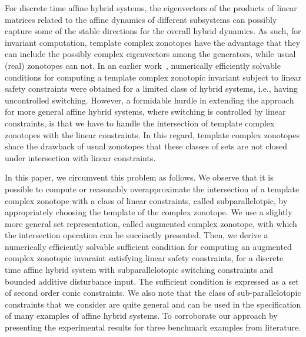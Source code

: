 

For discrete time affine hybrid systems, the eigenvectors of the
products of linear matrices related to the affine dynamics of
different subsystems can possibly capture some of the stable
directions for the overall hybrid dynamics.  As such, for invariant
computation, template complex zonotopes have the advantage that they
can include the possibly complex eigenvectors among the generators,
while usual (real) zonotopes can not.  In an earlier
work~\cite{tcz2017}, numerically efficiently solvable conditions for
computing a template complex zonotopic invariant subject to linear
safety constraints were obtained for a limited class of hybrid
systems, i.e., having uncontrolled switching.  However, a formidable
hurdle in extending the approach for more general affine hybrid
systems, where switching is controlled by linear constraints, is that
we have to handle the intersection of template complex zonotopes with
the linear constraints.  In this regard, template complex zonotopes
share the drawback of usual zonotopes that these classes of sets are
not closed under intersection with linear constraints.

In this paper, we circumvent this problem as follows.  We observe that
it is possible to compute or reasonably overapproximate the
intersection of a template complex zonotope with a class of linear
constraints, called subparallelotpic, by appropriately choosing the
template of the complex zonotope.  We use a slightly more general set
representation, called augmented complex zonotope, with which the
intersection operation can be succinctly presented.  %
Then, we derive a numerically efficiently solvable
sufficient condition for computing an augmented complex zonotopic
invaraint satisfying linear safety constraints, for a discrete time
affine hybrid system with subparallelotopic switching constraints and
bounded additive disturbance input.  The sufficient condition is
expressed as a set of second order conic constraints.  We also note
that the class of sub-parallelotopic constraints that we consider are
quite general and can be used in the specification of many examples of 
affine hybrid systems.  To corroborate our approach by presenting the
experimental results for three benchmark examples from literature.

